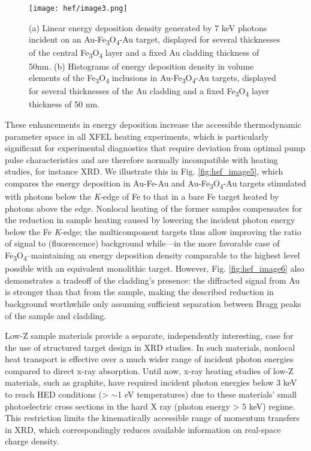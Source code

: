 \begin{figure}[h]
\caption{
(a) Linear energy deposition density generated by 7 keV
photons incident on an Au-Fe\textsubscript{3}O\textsubscript{4}-Au
target, displayed for several thicknesses of the central
Fe\textsubscript{3}O\textsubscript{4} layer and a fixed Au cladding
thickness of 50nm. (b) Histograms of energy deposition density in volume
elements of the Fe\textsubscript{3}O\textsubscript{4} inclusions in
Au-Fe\textsubscript{3}O\textsubscript{4}-Au targets, displayed for
several thicknesses of the Au cladding and a fixed
Fe\textsubscript{3}O\textsubscript{4} layer thickness of 50 nm.
}
\label{fig:hef_image3}
\centering
\texttt{[image: hef/image3.png]}
\end{figure}

These enhancements in energy deposition increase the accessible
thermodynamic parameter space in all XFEL heating experiments, which is
particularly significant for experimental diagnostics that require
deviation from optimal pump pulse characteristics and are therefore
normally incompatible with heating studies, for instance XRD. We
illustrate this in Fig. \ref{fig:hef_image5}, which compares the energy deposition in
Au-Fe-Au and Au-Fe\textsubscript{3}O\textsubscript{4}-Au targets
stimulated with photons below the \emph{K}-edge of Fe to that in a bare
Fe target heated by photons above the edge. Nonlocal heating of the
former samples compensates for the reduction in sample heating caused by
lowering the incident photon energy below the Fe \emph{K}-edge; the
multicomponent targets thus allow improving the ratio of signal to
(fluorescence) background while---in the more favorable case of
Fe\textsubscript{3}O\textsubscript{4}--maintaining an energy deposition
density comparable to the highest level possible with an equivalent
monolithic target. However, Fig. \ref{fig:hef_image6} also demonstrates a tradeoff of the
cladding's presence: the diffracted signal from Au is stronger than that
from the sample, making the described reduction in background worthwhile
only assuming sufficient separation between Bragg peaks of the sample
and cladding.

\FloatBarrier


Low-Z sample materials provide a separate, independently interesting,
case for the use of structured target design in XRD studies. In such
materials, nonlocal heat transport is effective over a much wider range
of incident photon energies compared to direct x-ray absorption. Until
now, x-ray heating studies of low-Z materials, such as graphite, have
required incident photon energies below 3 keV to reach HED conditions
(\textgreater{} $\sim$1 eV temperatures) due to these
materials' small photoelectric cross sections in the hard X ray (photon
energy \textgreater{} 5 keV) regime. This restriction limits the
kinematically accessible range of momentum transfers in XRD, which
correspondingly reduces available information on real-space charge
density.

